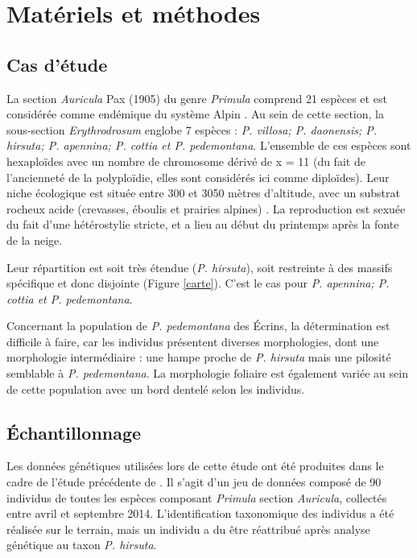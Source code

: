 
\section{Matériels et méthodes}

\subsection{Cas d'étude}

La section \textit{Auricula} Pax (1905) du genre \textit{Primula} comprend 21 espèces et est considérée comme endémique du système Alpin \citep{Ozenda1995}. Au sein de cette section, la sous-section \textit{Erythrodrosum} englobe 7 espèces : \textit{P. villosa; P. daonensis; P. hirsuta; P. apennina; P. cottia et P. pedemontana}. L'ensemble de ces espèces sont hexaploïdes avec un nombre de chromosome dérivé de x = 11 (du fait de l'ancienneté de la polyploïdie, elles sont considérés ici comme diploïdes). Leur niche écologique est située entre 300 et 3050 mètres d'altitude, avec un substrat rocheux acide (crevasses, éboulis et prairies alpines) \citep{Zhang2004}. La reproduction est sexuée du fait d'une hétérostylie stricte, et a lieu au début du printemps après la fonte de la neige.

Leur répartition est soit très étendue (\textit{P. hirsuta}), soit restreinte à des massifs spécifique et donc disjointe (Figure \ref{carte}). C'est le cas pour \textit{P. apennina; P. cottia et P. pedemontana}.

Concernant la population de \textit{P. pedemontana} des Écrins, la détermination est difficile à faire, car les individus présentent diverses morphologies, dont une morphologie intermédiaire : une hampe proche de \textit{P. hirsuta} mais une pilosité semblable à \textit{P. pedemontana}. La morphologie foliaire est également variée au sein de cette population avec un bord dentelé selon les individus.

\subsection{Échantillonnage}

Les données génétiques utilisées lors de cette étude ont été produites dans le cadre de l'étude précédente de \citet{Boucher2016a}. Il s'agit d'un jeu de données composé de 90 individus de toutes les espèces composant \textit{Primula} section \textit{Auricula}, collectés entre avril et septembre 2014. L'identification taxonomique des individus a été réalisée sur le terrain, mais un individu a du être réattribué après analyse génétique au taxon \textit{P. hirsuta}.

